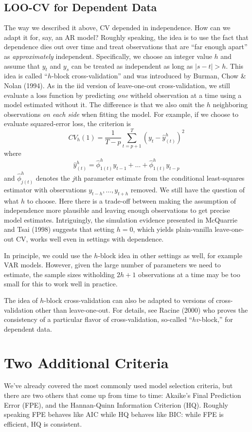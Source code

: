 \documentclass[12pt]{article}
\theoremstyle{definition}
\begin{document}
\subsection{LOO-CV for Dependent Data}
The way we described it above, CV depended in independence. How can we adapt it for, say, an AR model? Roughly speaking, the idea is to use the fact that dependence dies out over time and treat observations that are ``far enough apart'' as \emph{approximately} independent. Specifically, we choose an integer value $h$ and assume that $y_t$ and $y_s$ can be treated as independent as long as $|s - t|>h$. This idea is called ``$h$-block cross-validation'' and was introduced by Burman, Chow \& Nolan (1994). As in the iid version of leave-one-out cross-validation, we still evaluate a loss function by predicting \emph{one} witheld observation at a time using a model estimated without it. The difference is that we also omit the $h$ neighboring observations \emph{on each side} when fitting the model. For example, if we choose to evaluate squared-error loss, the criterion is
	$$CV_h(1) = \frac{1}{T-p}\sum_{t = p+1}^T \left(y_t - \hat{y}_{(t)}^h\right)^2$$
where 
$$\hat{y}^h_{(t)} = \hat{\phi}^h_{1(t)} y_{t-1} + \hdots + \hat{\phi}^h_{1(t)}y_{t-p}$$
and $\hat{\phi}^h_{j(t)}$ denotes the $j$th parameter estimate from the conditional least-squares estimator with observations $y_{t-h}, \hdots,  y_{t+h}$ removed. We still have the question of what $h$ to choose. Here there is a trade-off between making the assumption of independence more plausible and leaving enough observations to get precise model estimates. Intriguingly, the simulation evidence presented in McQuarrie and Tsai (1998) suggests that setting $h=0$, which yields plain-vanilla leave-one-out CV, works well even in settings with dependence.

In principle, we could use the $h$-block idea in other settings as well, for example VAR models. However, given the large number of parameters we need to estimate, the sample sizes witholding $2h+1$ observations at a time may be too small for this to work well in practice.


The idea of $h$-block cross-validation can also be adapted to versions of cross-validation other than leave-one-out. For details, see Racine (2000) who proves the consistency of a particular flavor of cross-validation, so-called ``$hv$-block,'' for dependent data.


\section{Two Additional Criteria}
We've already covered the most commonly used model selection criteria, but there are two others that come up from time to time: Akaike's Final Prediction Error (FPE), and the Hannan-Quinn Information Criterion (HQ). Roughly speaking FPE behaves like AIC while HQ behaves like BIC: while FPE is efficient, HQ is consistent.
\end{document}
